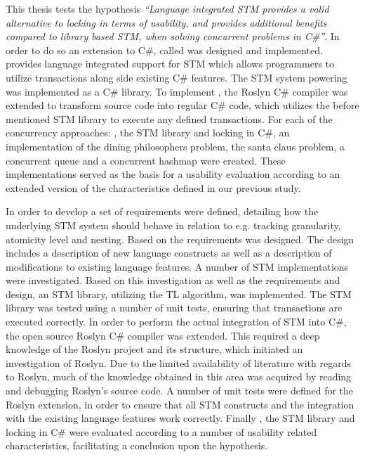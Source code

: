 \makeatletter {}\makeatother
{}

This thesis tests the hypothesis \textit{``Language integrated \ac{STM} provides a valid alternative to locking in terms of usability, and provides additional benefits compared to library based \ac{STM}, when solving concurrent problems in C\#''}. In order to do so an extension to C\#, called \stmname was designed and implemented. \stmname provides language integrated support for \ac{STM} which allows programmers to utilize transactions along side existing C\# features. The \ac{STM} system powering \stmname was implemented as a C\# library. To implement \stmname, the Roslyn C\# compiler was extended to transform \stmname source code into regular C\# code, which utilizes the before mentioned \ac{STM} library to execute any defined transactions. For each of the concurrency approaches: \stmname, the \ac{STM} library and locking in C\#, an implementation of the dining philosophers problem, the santa claus problem, a concurrent queue and a concurrent hashmap were created. These implementations served as the basis for a usability evaluation according to an extended version of the characteristics defined in our previous study\cite{dpt907e14trending}. 

In order to develop \stmname a set of requirements were defined, detailing how the underlying \ac{STM} system should behave in relation to e.g. tracking granularity, atomicity level and nesting. Based on the requirements \stmname was designed. The design includes a description of new language constructs as well as a description of modifications to existing language features. A number of \ac{STM} implementations were investigated. Based on this investigation as well as the requirements and design, an \ac{STM} library, utilizing the TL algorithm, was implemented. The \ac{STM} library was tested using a number of unit tests, ensuring that transactions are executed correctly. In order to perform the actual integration of \ac{STM} into C\#, the open source Roslyn C\# compiler was extended. This required a deep knowledge of the Roslyn project and its structure, which initiated an investigation of Roslyn. Due to the limited availability of literature with regards to Roslyn, much of the knowledge obtained in this area was acquired by reading and debugging Roslyn's source code. A number of unit tests were defined for the Roslyn extension, in order to ensure that all \ac{STM} constructs and the integration with the existing language features work correctly. Finally \stmname, the \ac{STM} library and locking in C\# were evaluated according to a number of usability related characteristics, facilitating a conclusion upon the hypothesis.

